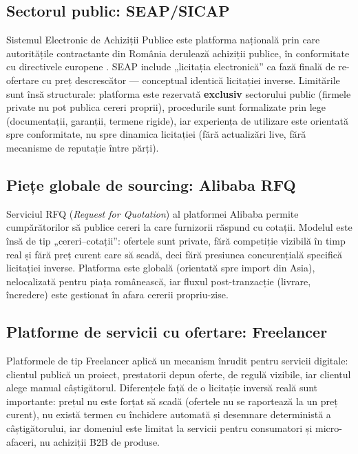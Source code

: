 \subsection{Sectorul public: SEAP/SICAP}

Sistemul Electronic de Achiziții Publice \cite{seapweb} este platforma națională prin care autoritățile contractante din România derulează achiziții publice, în conformitate cu directivele europene \cite{directive2014}. SEAP include „licitația electronică'' ca fază finală de re-ofertare cu preț descrescător --- conceptual identică licitației inverse. Limitările sunt însă structurale: platforma este rezervată \textbf{exclusiv} sectorului public (firmele private nu pot publica cereri proprii), procedurile sunt formalizate prin lege (documentații, garanții, termene rigide), iar experiența de utilizare este orientată spre conformitate, nu spre dinamica licitației (fără actualizări live, fără mecanisme de reputație între părți).

\subsection{Piețe globale de sourcing: Alibaba RFQ}

Serviciul RFQ (\textit{Request for Quotation}) al platformei Alibaba \cite{alibabarfq} permite cumpărătorilor să publice cereri la care furnizorii răspund cu cotații. Modelul este însă de tip „cereri--cotații'': ofertele sunt private, fără competiție vizibilă în timp real și fără preț curent care să scadă, deci fără presiunea concurențială specifică licitației inverse. Platforma este globală (orientată spre import din Asia), nelocalizată pentru piața românească, iar fluxul post-tranzacție (livrare, încredere) este gestionat în afara cererii propriu-zise.

\subsection{Platforme de servicii cu ofertare: Freelancer}

Platformele de tip Freelancer \cite{freelancerweb} aplică un mecanism înrudit pentru servicii digitale: clientul publică un proiect, prestatorii depun oferte, de regulă vizibile, iar clientul alege manual câștigătorul. Diferențele față de o licitație inversă reală sunt importante: prețul nu este forțat să scadă (ofertele nu se raportează la un preț curent), nu există termen cu închidere automată și desemnare deterministă a câștigătorului, iar domeniul este limitat la servicii pentru consumatori și micro-afaceri, nu achiziții B2B de produse.

